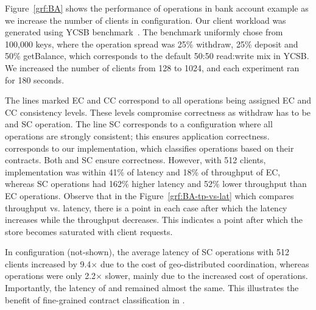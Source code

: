 Figure~\ref{grf:BA} shows the performance of operations in bank account example
as we increase the number of clients in  configuration. Our client
workload was generated using YCSB benchmark~\cite{YCSB}. The benchmark
uniformly chose from 100,000 keys, where the operation spread was 25\%
withdraw, 25\% deposit and 50\% getBalance, which corresponds to the default
50:50 read:write mix in YCSB. We increased the number of clients from 128 to
1024, and each experiment ran for 180 seconds.

The lines marked EC and CC correspond to all operations being assigned EC and
CC consistency levels. These levels compromise correctness as withdraw has to
be and SC operation. The line SC corresponds to a configuration where all
operations are strongly consistent; this ensures application correctness.
\quelea corresponds to our implementation, which classifies operations based on
their contracts. Both \quelea and SC ensure correctness. However, with 512
clients, \quelea implementation was within 41\% of latency and 18\% of
throughput of EC, whereas SC operations had 162\% higher latency and 52\% lower
throughput than EC operations. Observe that in the
Figure~\ref{grf:BA-tp-vs-lat} which compares throughput vs. latency, there is a
point in each case after which the latency increases while the throughput
decreases. This indicates a point after which the store becomes saturated with
client requests.

In  configuration (not-shown), the average latency of SC operations
with 512 clients increased by 9.4$\times$ due to the cost of geo-distributed
coordination, whereas \quelea operations were only 2.2$\times$ slower, mainly
due to the increased cost of  operations. Importantly, the latency
of  and  remained almost the same. This illustrates
the benefit of fine-grained contract classification in \quelea.

